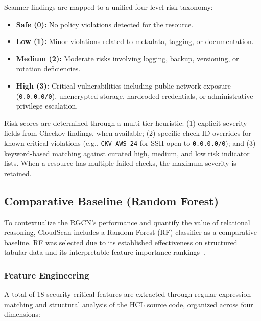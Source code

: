 \documentclass[conference]{IEEEtran}
\begin{document}
Scanner findings are mapped to a unified four-level risk taxonomy:

\begin{itemize}
    \item \textbf{Safe (0):} No policy violations detected for the resource.
    \item \textbf{Low (1):} Minor violations related to metadata, tagging, or documentation.
    \item \textbf{Medium (2):} Moderate risks involving logging, backup, versioning, or rotation deficiencies.
    \item \textbf{High (3):} Critical vulnerabilities including public network exposure (\texttt{0.0.0.0/0}), unencrypted storage, hardcoded credentials, or administrative privilege escalation.
\end{itemize}

Risk scores are determined through a multi-tier heuristic: (1) explicit severity fields from Checkov findings, when available; (2) specific check ID overrides for known critical violations (e.g., \texttt{CKV\_AWS\_24} for SSH open to \texttt{0.0.0.0/0}); and (3) keyword-based matching against curated high, medium, and low risk indicator lists. When a resource has multiple failed checks, the maximum severity is retained.

\subsection{Comparative Baseline (Random Forest)}

To contextualize the RGCN's performance and quantify the value of relational reasoning, CloudScan includes a Random Forest (RF) classifier as a comparative baseline. RF was selected due to its established effectiveness on structured tabular data and its interpretable feature importance rankings~\cite{shivakumar2023}.

\subsubsection{Feature Engineering}

A total of 18 security-critical features are extracted through regular expression matching and structural analysis of the HCL source code, organized across four dimensions:
\end{document}

